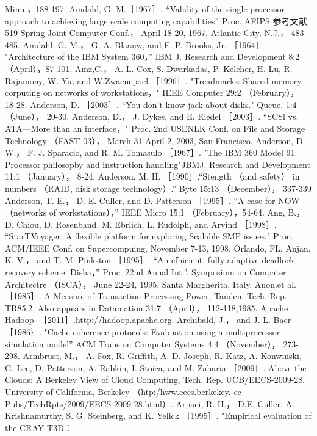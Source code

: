 Minn.，188-197.
Amdahl, G. M.［1967］. *Validity of the single processor approach to achieving large scale computing capabilities” Proc. AFIPS
参考文献
519
Spring Joint Computer Conf.， April 18-20, 1967, Atlantic City, N.J.， 483-485.
Amdahl, G. M.， G. A. Blaauw, and F. P. Brooks, Jr. ［1964］. "Architecture of the IBM System 360，” IBM J. Research and
Development 8:2 （April），87-101.
Amz,C.， A. L. Cox, S. Dwarkadas, P. Keleher, H. Lu, R. Rajamony, W. Yu, and W.Zwaenepoel ［1996］. "Treadmarks: Shared
memory corputing on networks of workstations，" IEEE Computer 29:2 （February）， 18-28.
Anderson, D. ［2003］. “You don't know jack about disks." Queue, 1:4 （June）， 20-30.
Anderson, D.， J. Dykes, and E. Riedel ［2003］. “SCSl vs. ATA—More than an interface，" Proc. 2nd USENLK Conf. on File and
Storage Technology （FAST 03）， March 31-April 2, 2003, San Francisco.
Anderson, D. W.， F. J. Sparacio, and R. M. Tomasulo ［1967］. "The IBM 360 Model 91: Processor philosopby and instruction
handling"JBMJ. Research and Development 11:1 （January）， 8-24.
Anderson, M. H. ［1990］.“Stength （and safety） in numbers （RAID, disk storage technology）.” Byte 15:13 （December）， 337-339
Anderson, T. E.， D. E. Culler, and D. Patterson ［1995］. “A case for NOW （networks of workstations），” IEEE Micro 15:1
（February），54-64.
Ang, B.，D. Chiou, D. Rosenband, M. Ebrlich, L. Rudolph, and Arvind ［1998］. “StarTVoyager: A flexible platform for exploring
Scalable SMP issues." Proc. ACM/IEEE Conf. on Supercompuing, November 7-13, 1998, Orlando, FL.
Anjan, K. V.， and T. M. Pinkston ［1995］. “An efhicient, fully-adaptive deadlock recovery scheme: Disha，” Proc. 22nd Anual
Int '. Symposium on Compater Architectre （ISCA）， June 22-24, 1995, Santa Margherita, Italy.
Anon.et al. ［1985］. A Measure of Transaction Processing Power, Tandem Tech. Rep. TR85.2. Also appears in Datamation 31:7
（April）， 112-118,1985.
Apache Hadoop. ［2011］.http://hadoop.apache.org.
Archibald, J.， and J.-L. Baer ［1986｝. "Cache coherence protocols: Evabuation using a multiprocessor simulation model” ACM
Trans.on Computer Systems 4:4 （November）， 273-298.
Armbrust, M.， A. Fox, R. Griffith, A. D. Joseph, R. Katz, A. Konwinski, G. Lee, D. Patterson, A. Rabkin, I. Stoica, and M.
Zaharia ［2009］. Above the Clouds: A Berkeley View of Cloud Computing, Tech. Rep. UCB/EECS-2009-28, University of
California, Berkeley （htp:/hww.eecs.berkekey. ec Pubs/TechRpts/2009/EECS-2009-28.html）.
Arpaci, R. H.， D.E. Culler, A. Krishnamurthy, S. G. Steinberg, and K. Yelick ［1995］. "Empirical evaluation of the CRAY-T3D：
